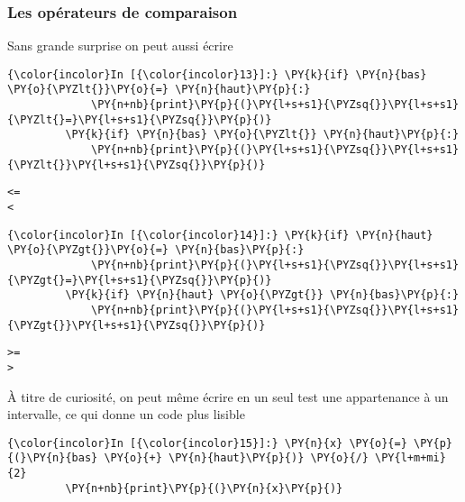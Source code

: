     \hypertarget{les-opuxe9rateurs-de-comparaison}{%
\subsubsection{Les opérateurs de
comparaison}\label{les-opuxe9rateurs-de-comparaison}}

    Sans grande surprise on peut aussi écrire

    \begin{Verbatim}[commandchars=\\\{\}]
{\color{incolor}In [{\color{incolor}13}]:} \PY{k}{if} \PY{n}{bas} \PY{o}{\PYZlt{}}\PY{o}{=} \PY{n}{haut}\PY{p}{:}
             \PY{n+nb}{print}\PY{p}{(}\PY{l+s+s1}{\PYZsq{}}\PY{l+s+s1}{\PYZlt{}=}\PY{l+s+s1}{\PYZsq{}}\PY{p}{)}
         \PY{k}{if} \PY{n}{bas} \PY{o}{\PYZlt{}} \PY{n}{haut}\PY{p}{:}
             \PY{n+nb}{print}\PY{p}{(}\PY{l+s+s1}{\PYZsq{}}\PY{l+s+s1}{\PYZlt{}}\PY{l+s+s1}{\PYZsq{}}\PY{p}{)}
\end{Verbatim}


    \begin{Verbatim}[commandchars=\\\{\}]
<=
<

    \end{Verbatim}

    \begin{Verbatim}[commandchars=\\\{\}]
{\color{incolor}In [{\color{incolor}14}]:} \PY{k}{if} \PY{n}{haut} \PY{o}{\PYZgt{}}\PY{o}{=} \PY{n}{bas}\PY{p}{:}
             \PY{n+nb}{print}\PY{p}{(}\PY{l+s+s1}{\PYZsq{}}\PY{l+s+s1}{\PYZgt{}=}\PY{l+s+s1}{\PYZsq{}}\PY{p}{)}
         \PY{k}{if} \PY{n}{haut} \PY{o}{\PYZgt{}} \PY{n}{bas}\PY{p}{:}
             \PY{n+nb}{print}\PY{p}{(}\PY{l+s+s1}{\PYZsq{}}\PY{l+s+s1}{\PYZgt{}}\PY{l+s+s1}{\PYZsq{}}\PY{p}{)}
\end{Verbatim}


    \begin{Verbatim}[commandchars=\\\{\}]
>=
>

    \end{Verbatim}

    À titre de curiosité, on peut même écrire en un seul test une
appartenance à un intervalle, ce qui donne un code plus lisible

    \begin{Verbatim}[commandchars=\\\{\}]
{\color{incolor}In [{\color{incolor}15}]:} \PY{n}{x} \PY{o}{=} \PY{p}{(}\PY{n}{bas} \PY{o}{+} \PY{n}{haut}\PY{p}{)} \PY{o}{/} \PY{l+m+mi}{2}
         \PY{n+nb}{print}\PY{p}{(}\PY{n}{x}\PY{p}{)}
\end{Verbatim}


